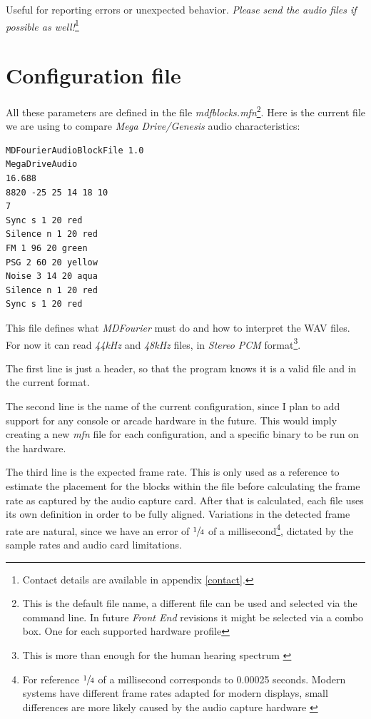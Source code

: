 \documentclass[10pt,a4paper]{report}
\begin{document}
\begin{appendices}
Useful for reporting errors or unexpected behavior. \textit{Please send the audio files if possible as well!}\footnote{Contact details are available in appendix \ref{contact}.}
	
\chapter{Configuration file}
\label{mfnconfig}

All these parameters are defined in the file \textit{mdfblocks.mfn}\footnote{This is the default file name, a different file can be used and selected via the command line. In future \textit{Front End} revisions it might be selected via a combo box. One for each supported hardware profile}. Here is the current file we are using to compare \textit{Mega Drive/Genesis} audio characteristics:

\begin{verbatim}
MDFourierAudioBlockFile 1.0
MegaDriveAudio
16.688
8820 -25 25 14 18 10
7
Sync s 1 20 red
Silence n 1 20 red
FM 1 96 20 green
PSG 2 60 20 yellow
Noise 3 14 20 aqua
Silence n 1 20 red
Sync s 1 20 red
\end{verbatim}

This file defines what \textit{MDFourier} must do and how to interpret the WAV files. For now it can read \textit{44kHz} and \textit{48kHz} files, in \textit{Stereo PCM} format\footnote{This is more than enough for the human hearing spectrum \cite{MontyMontgomery}}.

The first line is just a header, so that the program knows it is a valid file and in the current format.

The second line is the name of the current configuration, since I plan to add support for any console or arcade hardware in the future. This would imply creating a new \textit{mfn} file for each configuration, and a specific binary to be run on the hardware.

The third line is the expected frame rate. This is only used as a reference to estimate the placement for the blocks within the file before calculating the frame rate as captured by the audio capture card. After that is calculated, each file uses its own definition in order to be fully aligned. Variations in the detected frame rate are natural, since we have an error of $\sfrac{1}{4}$ of a millisecond\footnote{For reference $\sfrac{1}{4}$ of a millisecond corresponds to 0.00025 seconds. Modern systems have different frame rates adapted for modern displays, small differences are more likely caused by the audio capture hardware \cite{SoundCardClock}}, dictated by the sample rates and audio card limitations.


\end{appendices}
\end{document}

